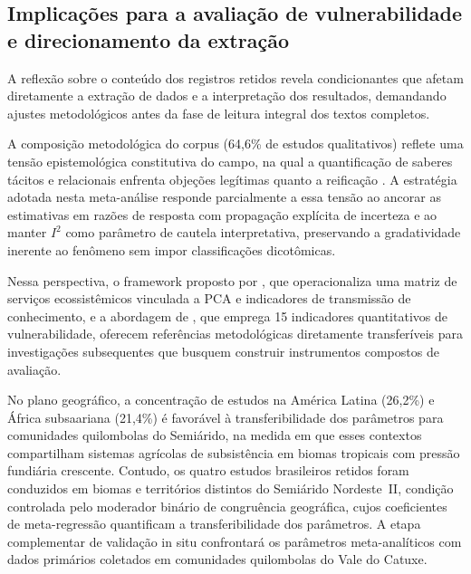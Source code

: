 \subsection{Implicações para a avaliação de vulnerabilidade e direcionamento da extração}
\label{sec:vulnerability-implications_cap2}

A reflexão sobre o conteúdo dos registros retidos revela condicionantes que afetam diretamente a extração de dados e a interpretação dos resultados, demandando ajustes metodológicos antes da fase de leitura integral dos textos completos.

A composição metodológica do corpus (64,6\% de estudos qualitativos) reflete uma tensão epistemológica constitutiva do campo, na qual a quantificação de saberes tácitos e relacionais enfrenta objeções legítimas quanto a reificação \cite{Agrawal2002,GomezBaggethun2013}. A estratégia adotada nesta meta-análise responde parcialmente a essa tensão ao ancorar as estimativas em razões de resposta com propagação explícita de incerteza e ao manter $I^2$ como parâmetro de cautela interpretativa, preservando a gradatividade inerente ao fenômeno sem impor classificações dicotômicas.

Nessa perspectiva, o framework proposto por , que operacionaliza uma matriz de serviços ecossistêmicos vinculada a PCA e indicadores de transmissão de conhecimento, e a abordagem de , que emprega 15 indicadores quantitativos de vulnerabilidade, oferecem referências metodológicas diretamente transferíveis para investigações subsequentes que busquem construir instrumentos compostos de avaliação.

No plano geográfico, a concentração de estudos na América Latina (26,2\%) e África subsaariana (21,4\%) é favorável à transferibilidade dos parâmetros para comunidades quilombolas do Semiárido, na medida em que esses contextos compartilham sistemas agrícolas de subsistência em biomas tropicais com pressão fundiária crescente. Contudo, os quatro estudos brasileiros retidos \cite{Goncalves2022,Bastos2022,deSousa2024,Avila2021} foram conduzidos em biomas e territórios distintos do Semiárido Nordeste~II, condição controlada pelo moderador binário de congruência geográfica, cujos coeficientes de meta-regressão quantificam a transferibilidade dos parâmetros. A etapa complementar de validação in situ confrontará os parâmetros meta-analíticos com dados primários coletados em comunidades quilombolas do Vale do Catuxe.

